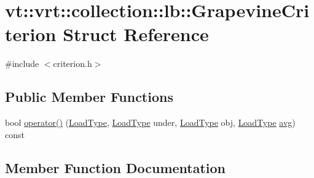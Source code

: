 \hypertarget{structvt_1_1vrt_1_1collection_1_1lb_1_1_grapevine_criterion}{}\section{vt\+:\+:vrt\+:\+:collection\+:\+:lb\+:\+:Grapevine\+Criterion Struct Reference}
\label{structvt_1_1vrt_1_1collection_1_1lb_1_1_grapevine_criterion}


{\ttfamily \#include $<$criterion.\+h$>$}

\subsection*{Public Member Functions}
\begin{DoxyCompactItemize}
\item 
bool \hyperlink{structvt_1_1vrt_1_1collection_1_1lb_1_1_grapevine_criterion_a2eb0e24abfcf4bea47588b77a0a6b1f0}{operator()} (\hyperlink{namespacevt_a8fb51741340b87d7aaee0bef60e9896b}{Load\+Type}, \hyperlink{namespacevt_a8fb51741340b87d7aaee0bef60e9896b}{Load\+Type} under, \hyperlink{namespacevt_a8fb51741340b87d7aaee0bef60e9896b}{Load\+Type} obj, \hyperlink{namespacevt_a8fb51741340b87d7aaee0bef60e9896b}{Load\+Type} \hyperlink{namespacevt_1_1vrt_1_1collection_1_1lb_a74989c7b4dd16fcc067e90a29cd1febeae322d423f075b0ab2daad27011d24909}{avg}) const
\end{DoxyCompactItemize}


\subsection{Member Function Documentation}
\mbox{\label{structvt_1_1vrt_1_1collection_1_1lb_1_1_grapevine_criterion_a2eb0e24abfcf4bea47588b77a0a6b1f0}} 

